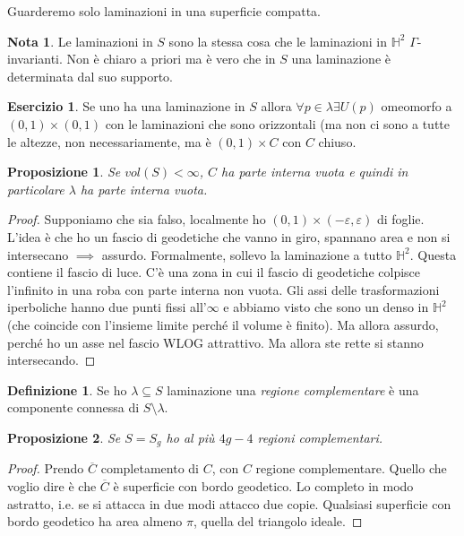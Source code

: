 \documentclass[a4paper]{article}
\newtheorem{proposition}{Proposizione}
\theoremstyle{definition}
\newtheorem{definition}{Definizione}
\newtheorem{exercise}{Esercizio}
\newtheorem{remark}{Nota}
\begin{document}
    Guarderemo solo laminazioni in una superficie compatta.

    \begin{remark}
        Le laminazioni in $S$ sono la stessa cosa che le laminazioni in $\mathbb H^2$ $\Gamma$-invarianti. Non è chiaro a priori ma è vero che in $S$ una laminazione è determinata dal suo supporto.
    \end{remark}

    \begin{exercise}
        Se uno ha una laminazione in $S$ allora $\forall p \in \lambda \exists U(p)$ omeomorfo a $(0,1) \times (0,1)$ con le laminazioni che sono orizzontali (ma non ci sono a tutte le altezze, non necessariamente, ma è $(0,1) \times C$ con $C$ chiuso.
    \end{exercise}

    \begin{proposition}
        Se $vol(S) < \infty$, $C$ ha parte interna vuota e quindi in particolare $\lambda$ ha parte interna vuota.
    \end{proposition}

    \begin{proof}
        Supponiamo che sia falso, localmente ho $(0,1) \times (-\varepsilon,\varepsilon)$ di foglie. L'idea è che ho un fascio di geodetiche che vanno in giro, spannano area e non si intersecano $\implies$ assurdo.
        Formalmente, sollevo la laminazione a tutto $\mathbb H^2$. Questa contiene il fascio di luce. C'è una zona in cui il fascio di geodetiche colpisce l'infinito in una roba con parte interna non vuota. Gli assi delle trasformazioni iperboliche hanno due punti fissi all'$\infty$ e abbiamo visto che sono un denso in $\mathbb H^2$ (che coincide con l'insieme limite perché il volume è finito). Ma allora assurdo, perché ho un asse nel fascio WLOG attrattivo. Ma allora ste rette si stanno intersecando.
    \end{proof}

    \begin{definition}
        Se ho $\lambda \subseteq S$ laminazione una \emph{regione complementare} è una componente connessa di $S \setminus \lambda$.
    \end{definition}

    \begin{proposition}
        Se $S = S_g$ ho al più $4g - 4$ regioni complementari.
    \end{proposition}

    \begin{proof}
        Prendo $\overline{C}$ completamento di $C$, con $C$ regione complementare. Quello che voglio dire è che $\overline{C}$ è superficie con bordo geodetico. Lo completo in modo astratto, i.e. se si attacca in due modi attacco due copie. Qualsiasi superficie con bordo geodetico ha area almeno $\pi$, quella del triangolo ideale.
    \end{proof}
\end{document}
